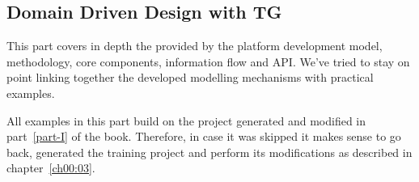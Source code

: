 \begin{partbacktext}
\part{Domain Driven Design with TG}  
  This part covers in depth the provided by the platform development model, methodology, core components, information flow and API.
  We've tried to stay on point linking together the developed modelling mechanisms with practical examples.
  

  All examples in this part build on the project generated and modified in part~\ref{part-I} of the book.
  Therefore, in case it was skipped it makes sense to go back, generated the training project and perform its modifications as described in chapter~\ref{ch00:03}.
\end{partbacktext}
